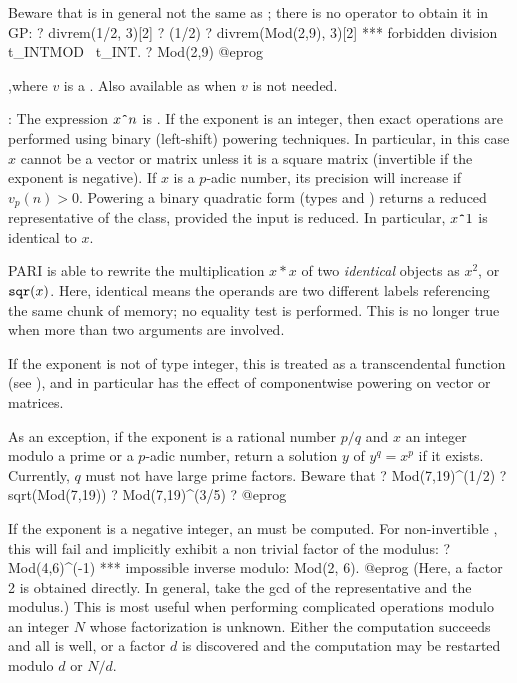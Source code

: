 Beware that  is in general not the same as
; there is no operator to obtain it in GP:
\bprog
? divrem(1/2, 3)[2]
? (1/2) %
? divrem(Mod(2,9), 3)[2]
  ***   forbidden division t_INTMOD \ t_INT.
? Mod(2,9) %
@eprog

,where $v$ is a . Also available as
 when $v$ is not needed.

\subseckbd{\pow}: The expression $x\hbox{{\tt \^{}\hskip0pt}}n$ is .
If the exponent is an integer, then exact operations are performed using
binary (left-shift) powering techniques. In particular, in this case $x$
cannot be a vector or matrix unless it is a square matrix (invertible
if the exponent is negative). If $x$ is a $p$-adic number, its
precision will increase if $v_p(n) > 0$. Powering a binary quadratic form
(types  and ) returns a reduced representative of the
class, provided the input is reduced. In particular, $x\hbox{{\tt \^{}\hskip0pt}}1$ is
identical to $x$.

PARI is able to rewrite the multiplication $x * x$ of two \emph{identical}
objects as $x^2$, or ${\tt sqr}(x)$. Here, identical means the operands are
two different labels referencing the same chunk of memory; no equality test
is performed. This is no longer true when more than two arguments are
involved.

If the exponent is not of type integer, this is treated as a transcendental
function (see ), and in particular has the effect of
componentwise powering on vector or matrices.

As an exception, if the exponent is a rational number $p/q$ and $x$ an
integer modulo a prime or a $p$-adic number, return a solution $y$ of
$y^q=x^p$ if it exists. Currently, $q$ must not have large prime factors.
Beware that
\bprog
    ? Mod(7,19)^(1/2)
    ? sqrt(Mod(7,19))
    ? Mod(7,19)^(3/5)
    ? %
@eprog

If the exponent is a negative integer, an  must be computed.
For non-invertible , this will fail and implicitly exhibit a
non trivial factor of the modulus:
\bprog
    ? Mod(4,6)^(-1)
      ***   impossible inverse modulo: Mod(2, 6).
@eprog\noindent
(Here, a factor 2 is obtained directly. In general, take the gcd of the
representative and the modulus.) This is most useful when performing
complicated operations modulo an integer $N$ whose factorization is
unknown. Either the computation succeeds and all is well, or a factor $d$
is discovered and the computation may be restarted modulo $d$ or $N/d$.

